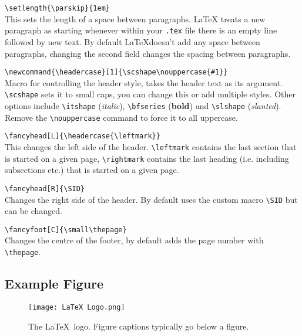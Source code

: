\documentclass[a4paper, 12pt, english]{article}
\begin{document}
            \verb+\setlength{\parskip}{1em}+\\
            This sets the length of a space between paragraphs. LaTeX treats a new paragraph as starting whenever within your \verb+.tex+ file there is an empty line followed by new text. By default \LaTeX doesn't add any space between paragraphs, changing the second field changes the spacing between paragraphs.

            \verb+\newcommand{\headercase}[1]{\scshape\nouppercase{#1}}+\\
            Macro for controlling the header style, takes the header text as its argument. \verb+\scshape+ sets it to small caps, you can change this or add multiple styles. Other options include \verb+\itshape+ ({\itshape italic}), \verb+\bfseries+ ({\bfseries bold}) and \verb+\slshape+ ({\slshape slanted}).\\
            Remove the \verb+\nouppercase+ command to force it to all uppercase.

            \verb+\fancyhead[L]{\headercase{\leftmark}}+\\
            This changes the left side of the header. \verb+\leftmark+ contains the last section that is started on a given page, \verb+\rightmark+ contains the last heading (i.e. including subsections etc.) that is started on a given page.

            \verb+\fancyhead[R]{\SID}+\\
            Changes the right side of the header. By default uses the custom macro \verb+\SID+ but can be changed.

            \verb+\fancyfoot[C]{\small\thepage}+\\
            Changes the centre of the footer, by default adds the page number with \verb+\thepage+.


    \newpage




    \newpage


    \appendices

        \subsection{Example Figure}
            \label{app: example figure}

            \begin{figure}[!h]
                \centering
                \texttt{[image: LaTeX Logo.png]}    

                \caption{The \LaTeX~logo. Figure captions typically go below a figure.}
                \label{fig: latex logo}
            \end{figure}
\end{document}
